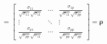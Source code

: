         \[
            =
            \begin{bmatrix}
                \frac{\sigma_{11}}{\sqrt{\sigma_{11}}\sqrt{\sigma_{11}}} & \cdots & \frac{\sigma_{1p}}{\sqrt{\sigma_{11}}\sqrt{\sigma_{pp}}} \\
                \vdots & \ddots & \vdots \\
                \frac{\sigma_{p1}}{\sqrt{\sigma_{pp}}\sqrt{\sigma_{11}}} & \cdots & \frac{\sigma_{pp}}{\sqrt{\sigma_{pp}}\sqrt{\sigma_{pp}}}
            \end{bmatrix}
            = \bm{\rho}
        \]
